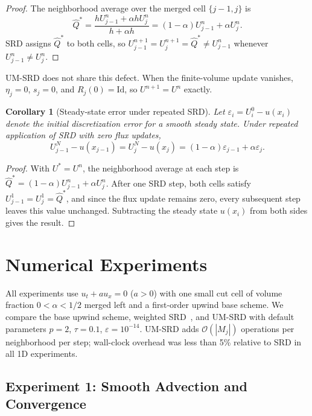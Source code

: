 \documentclass[11pt]{article}
\newtheorem{corollary}{Corollary}
\begin{document}
\begin{proof}
The neighborhood average over the merged cell $\{j-1, j\}$ is
\[
  \hat{Q}^* = \frac{h U_{j-1}^n + \alpha h U_j^n}{h + \alpha h}
  = (1-\alpha) U_{j-1}^n + \alpha U_j^n.
\]
SRD assigns $\hat{Q}^*$ to both cells, so $U_{j-1}^{n+1} = U_j^{n+1} = 
\hat{Q}^* \ne U_{j-1}^n$ whenever $U_{j-1}^n \ne U_j^n$.
\end{proof}

UM-SRD does not share this defect. When the finite-volume update vanishes, 
$\eta_j = 0$, $s_j = 0$, and $R_j(0) = \mathrm{Id}$, so $U^{n+1} = U^n$ 
exactly.

\begin{corollary}[Steady-state error under repeated SRD]
\label{cor:steady-accumulation}
Let $\varepsilon_i = U_i^0 - u(x_i)$ denote the initial discretization 
error for a smooth steady state. Under repeated application of SRD with 
zero flux updates,
\[
  U_{j-1}^N - u(x_{j-1})
  = U_j^N - u(x_j)
  = (1-\alpha)\varepsilon_{j-1} + \alpha\varepsilon_j.
\]
\end{corollary}

\begin{proof}
With $U^* = U^n$, the neighborhood average at each step is 
$\hat{Q}^* = (1-\alpha)U_{j-1}^n + \alpha U_j^n$. After one SRD step, 
both cells satisfy $U_{j-1}^1 = U_j^1 = \hat{Q}^*$, and since the flux 
update remains zero, every subsequent step leaves this value unchanged. 
Subtracting the steady state $u(x_i)$ from both sides gives the result.
\end{proof}
\section{Numerical Experiments}\label{sec:numerics}

All experiments use $u_t + au_x = 0$ ($a > 0$) with one small cut cell of 
volume fraction $0 < \alpha < 1/2$ merged left and a first-order upwind base 
scheme. We compare the base upwind scheme, weighted SRD~\cite{berger2024}, 
and UM-SRD with default parameters $p=2$, $\tau=0.1$, $\varepsilon=10^{-14}$. 
UM-SRD adds $\mathcal{O}(|M_j|)$ operations per neighborhood per step; 
wall-clock overhead was less than 5\% relative to SRD in all 1D experiments.

\subsection{Experiment 1: Smooth Advection and Convergence}
\label{sec:exp-smooth}
\end{document}
